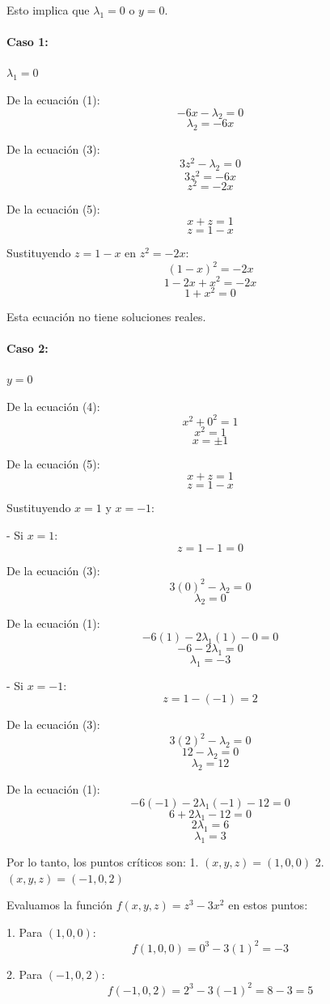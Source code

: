 \documentclass[11pt]{book}
\theoremstyle{definicion}
\theoremstyle{teorema}
\theoremstyle{ejemplo}
\begin{document}
Esto implica que \(\lambda_1 = 0\) o \(y = 0\).

\paragraph{Caso 1:} \(\lambda_1 = 0\)

De la ecuación (1):
\[ -6x - \lambda_2 = 0 \]
\[ \lambda_2 = -6x \]

De la ecuación (3):
\[ 3z^2 - \lambda_2 = 0 \]
\[ 3z^2 = -6x \]
\[ z^2 = -2x \]

De la ecuación (5):
\[ x + z = 1 \]
\[ z = 1 - x \]

Sustituyendo \( z = 1 - x \) en \( z^2 = -2x \):
\[ (1 - x)^2 = -2x \]
\[ 1 - 2x + x^2 = -2x \]
\[ 1 + x^2 = 0 \]

Esta ecuación no tiene soluciones reales.

\paragraph{Caso 2:} \( y = 0 \)

De la ecuación (4):
\[ x^2 + 0^2 = 1 \]
\[ x^2 = 1 \]
\[ x = \pm 1 \]

De la ecuación (5):
\[ x + z = 1 \]
\[ z = 1 - x \]

Sustituyendo \( x = 1 \) y \( x = -1 \):

- Si \( x = 1 \):
\[ z = 1 - 1 = 0 \]

De la ecuación (3):
\[ 3(0)^2 - \lambda_2 = 0 \]
\[ \lambda_2 = 0 \]

De la ecuación (1):
\[ -6(1) - 2\lambda_1 (1) - 0 = 0 \]
\[ -6 - 2\lambda_1 = 0 \]
\[ \lambda_1 = -3 \]

- Si \( x = -1 \):
\[ z = 1 - (-1) = 2 \]

De la ecuación (3):
\[ 3(2)^2 - \lambda_2 = 0 \]
\[ 12 - \lambda_2 = 0 \]
\[ \lambda_2 = 12 \]

De la ecuación (1):
\[ -6(-1) - 2\lambda_1 (-1) - 12 = 0 \]
\[ 6 + 2\lambda_1 - 12 = 0 \]
\[ 2\lambda_1 = 6 \]
\[ \lambda_1 = 3 \]

Por lo tanto, los puntos críticos son:
1. \( (x, y, z) = (1, 0, 0) \)
2. \( (x, y, z) = (-1, 0, 2) \)

Evaluamos la función \( f(x, y, z) = z^3 - 3x^2 \) en estos puntos:

1. Para \( (1, 0, 0) \):
\[ f(1, 0, 0) = 0^3 - 3(1)^2 = -3 \]

2. Para \( (-1, 0, 2) \):
\[ f(-1, 0, 2) = 2^3 - 3(-1)^2 = 8 - 3 = 5 \]
\end{document}
